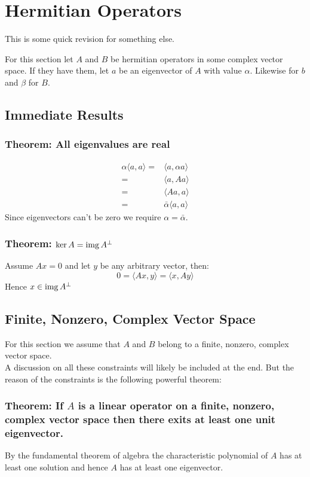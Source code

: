 
\section{Hermitian Operators}
This is some quick revision for something else.

For this section let $A$ and $B$ be hermitian operators in some complex vector space.
If they have them,
let $a$ be an eigenvector of $A$ with value $\alpha$.
Likewise for $b$ and $\beta$ for $B$.

\subsection{Immediate Results}
\subsubsection{Theorem: All eigenvalues are real}
\begin{equation*}
\begin{aligned}
\alpha\langle a,a\rangle =& \langle a,\alpha a\rangle\\
	=& \langle a, Aa\rangle\\
	=& \langle Aa, a\rangle\\
	=& \bar{\alpha}\langle a,a\rangle
\end{aligned}
\end{equation*}
Since eigenvectors can't be zero we require $\alpha=\bar{\alpha}$.

\subsubsection{Theorem: $\ker A = \operatorname{img} A^\perp$}
Assume $Ax=0$ and let $y$ be any arbitrary vector,
then:
\[0 = \langle Ax,y\rangle = \langle x, Ay\rangle \]
Hence $x\in\operatorname{img} A^\perp$

\subsection{Finite, Nonzero, Complex Vector Space}
For this section we assume that $A$ and $B$ belong to a finite, nonzero, complex vector space.
\\

A discussion on all these constraints will likely be included at the end.
But the reason of the constraints is the following powerful theorem:
\subsubsection{Theorem: If $A$ is a linear operator on a finite, nonzero, complex vector space then there exits at least one unit eigenvector.}
By the fundamental theorem of algebra the characteristic polynomial of $A$ has at least one solution and hence $A$ has at least one eigenvector.

